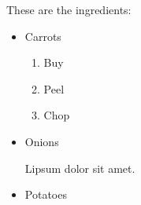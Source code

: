 \documentclass{article}
\begin{document}
These are the ingredients:
\begin{itemize}
    \item Carrots
    \begin{enumerate}
        \item Buy
        \item Peel
        \item Chop
    \end{enumerate}
    \item Onions
    
    Lipsum dolor sit amet.
    \item Potatoes
\end{itemize}
\end{document}
